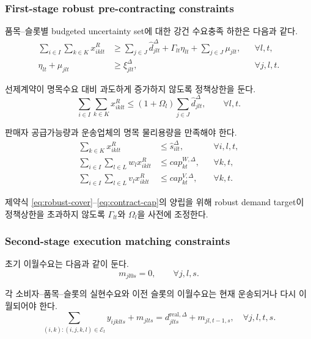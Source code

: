 \documentclass[11pt,a4paper]{article}
\newcommand{\Eset}{\mathcal{E}}
\begin{document}
\subsubsection{First-stage robust pre-contracting constraints}
품목--슬롯별 budgeted uncertainty set에 대한 강건 수요충족 하한은 다음과 같다.
\begin{align}
\sum_{i\in I}\sum_{k\in K}x^R_{iklt}
&\ge \sum_{j\in J}\hat d^{\Delta}_{jlt}
+\Gamma_{lt}\eta_{lt}+\sum_{j\in J}\mu_{jlt},
&&\forall l,t, \label{eq:robust-cover}\\
\eta_{lt}+\mu_{jlt}
&\ge \xi^{\Delta}_{jlt},
&&\forall j,l,t. \label{eq:robust-dual}
\end{align}

선제계약이 명목수요 대비 과도하게 증가하지 않도록 정책상한을 둔다.
\begin{equation}
\sum_{i\in I}\sum_{k\in K}x^R_{iklt}
\le (1+\Omega_l)\sum_{j\in J}\hat d^{\Delta}_{jlt},
\qquad \forall l,t.
\label{eq:contract-cap}
\end{equation}

판매자 공급가능량과 운송업체의 명목 물리용량을 만족해야 한다.
\begin{align}
\sum_{k\in K}x^R_{iklt}
&\le \hat s^{\Delta}_{ilt},
&&\forall i,l,t, \label{eq:supply}\\
\sum_{i\in I}\sum_{l\in L}w_lx^R_{iklt}
&\le cap^{W,\Delta}_{kt},
&&\forall k,t, \label{eq:pre-weight}\\
\sum_{i\in I}\sum_{l\in L}v_lx^R_{iklt}
&\le cap^{V,\Delta}_{kt},
&&\forall k,t. \label{eq:pre-volume}
\end{align}

제약식 \eqref{eq:robust-cover}--\eqref{eq:contract-cap}의 양립을 위해 robust demand target이 정책상한을 초과하지 않도록 $\Gamma_{lt}$와 $\Omega_l$을 사전에 조정한다.

\subsubsection{Second-stage execution matching constraints}
초기 이월수요는 다음과 같이 둔다.
\begin{equation}
m_{jl0s}=0,
\qquad \forall j,l,s.
\label{eq:initial-backlog}
\end{equation}

각 소비자--품목--슬롯의 실현수요와 이전 슬롯의 이월수요는 현재 운송되거나 다시 이월되어야 한다.
\begin{equation}
\sum_{(i,k):(i,j,k,l)\in\Eset_t}y_{ijklts}+m_{jlts}
=d^{\mathrm{real},\Delta}_{jlts}+m_{jl,t-1,s},
\quad \forall j,l,t,s.
\label{eq:demand-balance}
\end{equation}
\end{document}
